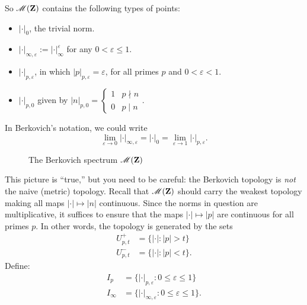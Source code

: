 So $\operatorname{\mathscr{M}}(\mathbf{Z})$ contains the following types of points:
\begin{itemize}
\item
$|\cdot|_0$, the trivial norm.

\item
$|\cdot|_{\infty,\varepsilon} := |\cdot|_\infty^\varepsilon$ for any 
$0<\varepsilon\leqslant 1$. 

\item
$|\cdot|_{p,\varepsilon}$, in which $|p|_{p,\varepsilon}=\varepsilon$, for all 
primes $p$ and $0<\varepsilon<1$. 

\item
$|\cdot|_{p,0}$ given by 
$|n|_{p,0} = \begin{cases} 1 & p\nmid n \\ 0 & p\mid n\end{cases}$. 
\end{itemize}
In Berkovich's notation, we could write 
\[
	\lim_{\varepsilon\to 0} |\cdot|_{\infty,\varepsilon} = |\cdot|_0 = \lim_{\varepsilon\to 1} |\cdot|_{p,\varepsilon} .
\]

\begin{figure}
\begin{center}
\end{center}
\caption{The Berkovich spectrum $\operatorname{\mathscr{M}}(\mathbf{Z})$}
\end{figure}

This picture is ``true,'' but you need 
to be careful: the Berkovich topology is \emph{not} the naive (metric) 
topology. Recall that $\operatorname{\mathscr{M}}(\mathbf{Z})$ should carry the weakest topology 
making all maps $|\cdot|\mapsto |n|$ continuous. Since the norms in question 
are multiplicative, it suffices to ensure that the maps $|\cdot|\mapsto |p|$ 
are continuous for all primes $p$. In other words, the topology is generated by 
the sets 
\begin{align*}
	U_{p,t}^+ &= \{|\cdot|\colon |p|>t\} \\
	U_{p,t}^- &= \{|\cdot|\colon |p|<t\} .
\end{align*}
Define: 
\begin{align*}
	I_p &= \{|\cdot|_{p,\varepsilon}\colon 0\leqslant \varepsilon \leqslant 1\} \\
	I_\infty &= \{|\cdot|_{\infty,\varepsilon}\colon 0\leqslant \varepsilon \leqslant 1\} .
\end{align*}

